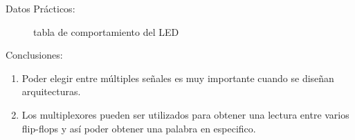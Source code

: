 \documentclass[11pt, letterpaper]{article}
\begin{document}
	\begin{block}{Datos Prácticos:\\}
		 \begin{figure}[H]
		 	\def\arraystretch{1.5}
		 	\caption{tabla de comportamiento del LED}
		 \end{figure}
  	
  		\begin{figure}[H]
			 
  		\end{figure}
	\end{block}

	\begin{block}{Conclusiones:\\}
		\begin{enumerate}
			\item Poder elegir entre múltiples señales es muy importante cuando se diseñan arquitecturas.
			\item Los multiplexores pueden ser utilizados para obtener una lectura entre varios flip-flops y así poder obtener una palabra en especifico.
		\end{enumerate}
	\end{block}

	
	
	\nocite{*}
	
\end{document}

